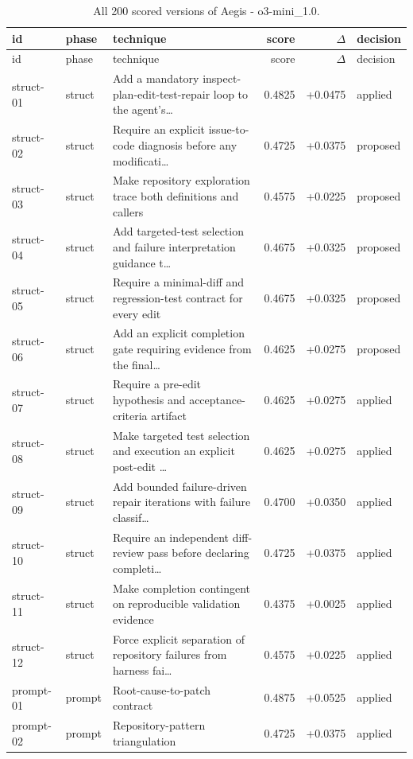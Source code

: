 \begin{center}\scriptsize\begin{longtable}{llp{5.2cm}rrl}
\caption{All 200 scored versions of Aegis - o3-mini\_1.0.}\\
\toprule id & phase & technique & score & $\Delta$ & decision \\ \midrule \endfirsthead
\toprule id & phase & technique & score & $\Delta$ & decision \\ \midrule \endhead
struct-01 & struct & Add a mandatory inspect-plan-edit-test-repair loop to the agent's\ldots{} & 0.4825 & +0.0475 & applied \\
struct-02 & struct & Require an explicit issue-to-code diagnosis before any modificati\ldots{} & 0.4725 & +0.0375 & proposed \\
struct-03 & struct & Make repository exploration trace both definitions and callers & 0.4575 & +0.0225 & proposed \\
struct-04 & struct & Add targeted-test selection and failure interpretation guidance t\ldots{} & 0.4675 & +0.0325 & proposed \\
struct-05 & struct & Require a minimal-diff and regression-test contract for every edit & 0.4675 & +0.0325 & proposed \\
struct-06 & struct & Add an explicit completion gate requiring evidence from the final\ldots{} & 0.4625 & +0.0275 & proposed \\
struct-07 & struct & Require a pre-edit hypothesis and acceptance-criteria artifact & 0.4625 & +0.0275 & applied \\
struct-08 & struct & Make targeted test selection and execution an explicit post-edit \ldots{} & 0.4625 & +0.0275 & applied \\
struct-09 & struct & Add bounded failure-driven repair iterations with failure classif\ldots{} & 0.4700 & +0.0350 & applied \\
struct-10 & struct & Require an independent diff-review pass before declaring completi\ldots{} & 0.4725 & +0.0375 & applied \\
struct-11 & struct & Make completion contingent on reproducible validation evidence & 0.4375 & +0.0025 & applied \\
struct-12 & struct & Force explicit separation of repository failures from harness fai\ldots{} & 0.4575 & +0.0225 & applied \\
prompt-01 & prompt & Root-cause-to-patch contract & 0.4875 & +0.0525 & applied \\
prompt-02 & prompt & Repository-pattern triangulation & 0.4725 & +0.0375 & applied \\

\end{longtable}
\end{center}
